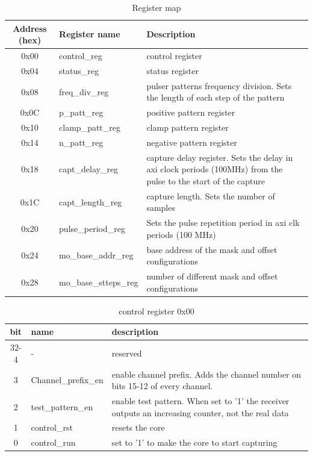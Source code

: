 \documentclass[12pt,a4paper]{book}
\begin{document}
\begin{table}
\begin{tabularx}{\linewidth}{|c|l|X|}
\hline 
Address (hex) & Register name& Description \\
\hline 
\hline 
0x00 & control\_reg & control register\\
\hline 
0x04 & status\_reg & status register \\
\hline 
0x08 & freq\_div\_reg & pulser patterns frequency division. Sets the length of each step of the pattern\\
\hline 
0x0C & p\_patt\_reg & positive pattern register\\
\hline 
0x10 & clamp\_patt\_reg & clamp pattern register\\
\hline 
0x14 & n\_patt\_reg & negative pattern register\\
\hline 
0x18 & capt\_delay\_reg & capture delay register. Sets the delay in axi clock periods (100MHz) from the pulse to the start of the capture\\
\hline 
0x1C & capt\_length\_reg & capture length. Sets the number of samples \\
\hline 
0x20 & pulse\_period\_reg & Sets the pulse repetition period in axi clk periods (100 MHz)\\
\hline 
0x24 & mo\_base\_addr\_reg & base address of the mask and offset configurations\\
\hline 
0x28 & mo\_base\_stteps\_reg & number of different mask and offset configurations\\
\hline
\end{tabularx} 
\caption{Register map}
\label{Registers} 
\end{table} 



\begin{table}
\begin{tabularx}{\linewidth}{|c|l|X|}
\hline 
bit & name & description \\
\hline
\hline
32-4 & - & reserved \\
\hline
3 & Channel\_prefix\_en & enable channel prefix. Adds the channel number on bits 15-12 of every channel.  \\
\hline
2 &  test\_pattern\_en & enable test pattern. When set to '1' the receiver outputs an increasing counter, not the real data  \\
\hline
1 & control\_rst & resets the core \\
\hline
0 & control\_run & set to '1' to make the core to start capturing \\
\hline
\end{tabularx} 
\caption{control register 0x00}
\label{control_reg} 
\end{table} 
\end{document}
